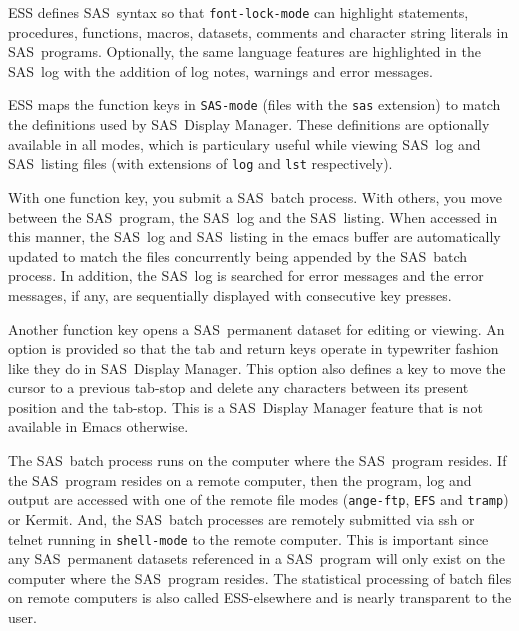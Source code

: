 \documentclass{article}
\newcommand*{\SAS}{\textsc{SAS}}
\newcommand{\stexttt}[1]{{\small\texttt{#1}}}
\newenvironment{Comment}{\begin{quote}\small\itshape }{\end{quote}}
\begin{document}
ESS defines \SAS\ syntax so that \stexttt{font-lock-mode} can highlight
statements, procedures, functions, macros, datasets, comments and character 
string literals in \SAS\ programs.  Optionally, the same language features 
are highlighted in the \SAS\ log with the addition of log notes, warnings 
and error messages.

ESS maps the function keys in \stexttt{SAS-mode} (files with the
\stexttt{sas} extension) to match the definitions used by \SAS\
Display Manager.  These definitions are optionally
available in all modes, which is particulary useful
while viewing \SAS\ log and \SAS\ listing files (with extensions of
\stexttt{log} and \stexttt{lst} respectively).

With one function key, you submit a \SAS\ batch process.  With others,
you move between the \SAS\ program, the \SAS\ log and the \SAS\
listing.  When accessed in this manner, the \SAS\ log and \SAS\
listing in the emacs buffer are automatically updated to match the
files concurrently being appended by the \SAS\ batch process.  In
addition, the \SAS\ log is searched for error messages and the error
messages, if any, are sequentially displayed with consecutive key
presses.

Another function key opens a \SAS\ permanent dataset for editing or viewing.  
An option is provided so that the tab and return keys operate in typewriter 
fashion like they do in \SAS\ Display Manager.  This option also defines a 
key to move the cursor to a previous tab-stop and delete any 
characters between its present position and the tab-stop.  This is a \SAS\
Display Manager feature that is not available in Emacs otherwise. 

The \SAS\ batch process runs on the computer where the \SAS\ program resides.  
If the \SAS\ program resides on a remote computer, then the program, log and 
output are accessed with one of the remote file modes (\stexttt{ange-ftp},
\stexttt{EFS} and \stexttt{tramp}) or Kermit.  And, the \SAS\ batch processes 
are remotely submitted via ssh or telnet running in \stexttt{shell-mode} to 
the remote computer.  This is important since any \SAS\ permanent datasets 
referenced in a \SAS\ program will only exist on the computer where the \SAS\ 
program resides.  The statistical processing of batch files on remote computers 
is also called ESS-elsewhere and is nearly transparent to the user. 

\end{document}
